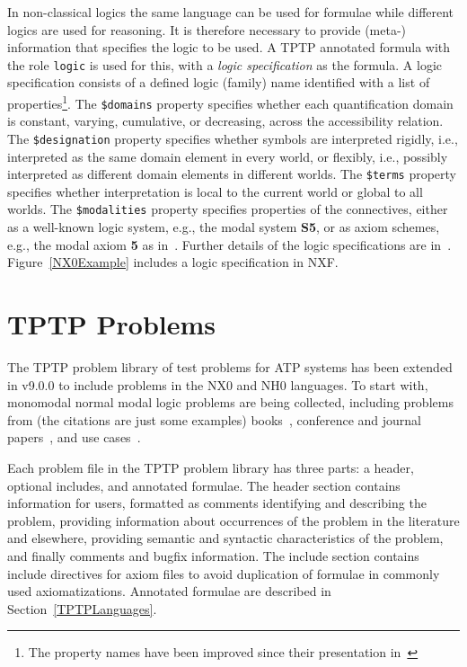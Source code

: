 \documentclass{ceurart}
\begin{document}
In non-classical logics the same language can be used for formulae while different logics are 
used for reasoning.
It is therefore necessary to provide \mbox{(meta-)} information that specifies the
logic to be used.
A TPTP annotated formula with the role \texttt{logic} is used for this, with a {\em logic 
specification} as the formula.
A logic specification consists of a defined logic (family) name identified with a list of 
properties\footnote{%
The property names have been improved since their presentation in~\cite{SF+22}}.
The {\tt \$domains} property specifies whether each quantification domain is constant, varying,
cumulative, or decreasing, across the accessibility relation.
The {\tt \$designation} property specifies whether symbols are interpreted rigidly, i.e., 
interpreted as the same domain element in every world, or flexibly, i.e., possibly interpreted 
as different domain elements in different worlds. 
The {\tt \$terms} property specifies whether interpretation is local to the current world or
global to all worlds.
The {\tt \$modalities} property specifies properties of the connectives, either as a well-known 
logic system, e.g., the modal system {\bf S5}, or as axiom schemes, e.g., the modal axiom {\bf 5} 
as in~\cite{Gar18}.
Further details of the logic specifications are in~\cite{SF+22}.
Figure~\ref{NX0Example} includes a logic specification in NXF.

\section{TPTP Problems}
\label{TPTP}

The TPTP problem library of test problems for ATP systems has been extended in v9.0.0 to include
problems in the NX0 and NH0 languages.
To start with, monomodal normal modal logic problems are being collected, including problems 
from (the citations are just some examples)
books~\cite{For94,FM98,Gir00,Sid10}, 
conference and journal papers~\cite{Rei92,FH+98,Sto00,PN+21}, 
and 
use cases~\cite{BW14-ECAI,MR22}.

Each problem file in the TPTP problem library has three parts: a header, optional includes, and 
annotated formulae. 
The header section contains information for users, formatted as comments identifying and 
describing the problem, providing information about occurrences of the problem in the literature 
and elsewhere, providing semantic and syntactic characteristics of the problem, and finally
comments and bugfix information. 
The include section contains include directives for axiom files to avoid duplication of formulae 
in commonly used axiomatizations. 
Annotated formulae are described in Section~\ref{TPTPLanguages}.
\end{document}
